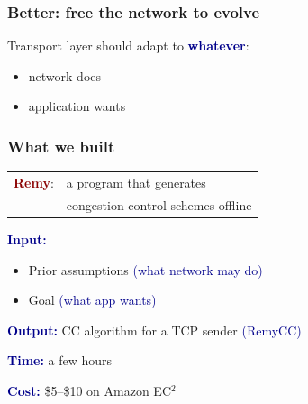 \documentclass[svgnames]{beamer}
\newcommand{\ssline}{\vspace{8 pt}}
\begin{document}
\begin{frame}
\frametitle{Better: free the network to evolve}

\Large Transport layer should adapt to \textbf{\textcolor{DarkBlue}{whatever}}:

\begin{itemize}
\item network does

\item application wants

\end{itemize}

\end{frame}

\begin{frame}
\frametitle{What we built}

\begin{centering}
\noindent \begin{tabular}{ll}
\Large \textcolor{DarkRed}{\bf Remy}: & \Large a program that generates \\ & \Large congestion-control schemes offline
\end{tabular}

\end{centering}

\ssline
\ssline

\textcolor{DarkBlue}{\bf Input:}

\begin{itemize}
\item Prior assumptions \hspace{3.01 cm} \textcolor{DarkBlue}{(what network may do)}

\item Goal \hspace{5.275 cm}\textcolor{DarkBlue}{(what app wants)}
\end{itemize}

\textcolor{DarkBlue}{\bf Output:} CC algorithm for a TCP sender \hspace{0.177 cm}\textcolor{DarkBlue}{(RemyCC)}

\ssline

\textcolor{DarkBlue}{\bf Time:} a few hours

\ssline

\textcolor{DarkBlue}{\bf Cost:} \$5--\$10 on Amazon EC$^2$

\end{frame}
\end{document}
